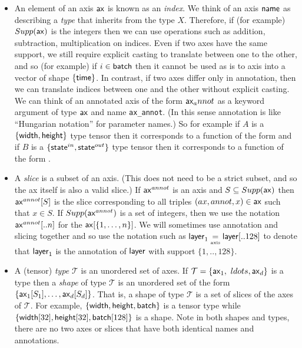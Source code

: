 \documentclass{article}
\newcommand{\defaxis}{\underset{\text{\tiny axis}}{=}}
\begin{document}
\begin{itemize}
  \item An element of an axis $\mathsf{ax}$ is known as an \emph{index}. We think of an axis $\mathsf{name}$ as describing a \emph{type} that inherits from the type $X$. Therefore, if (for example) $Supp(\mathsf{ax})$ is the integers then we can use operations such as addition, subtraction, multiplication on indices.  Even if two axes have the same support, we still require explicit casting to translate between one to the other, and so (for example) if $i \in \mathsf{batch}$ then it cannot be used as is to axis into a vector of shape $\{ \mathsf{time} \}$. In contrast, if two axes differ only in annotation, then we can translate indices between one and the other without explicit casting. We can think of an annotated axis of the form $\mathsf{ax}_annot$ as a keyword argument of type $\mathsf{ax}$ and name \texttt{ax\_annot}. (In this sense annotation is like ``Hungarian notation'' for parameter names.) So for example if $A$ is a $\{ \mathsf{width} , \mathsf{height} \}$ type tensor then it corresponds to a function of the form  and if $B$ is a $\{ \mathsf{state}^{in} , \mathsf{state}^{out} \}$ type tensor then it corresponds to a function of the form .


  
  \item A \emph{slice} is a subset of an axis. (This does not need to be a strict subset, and so the ax itself is also a valid slice.)  If $\mathsf{ax}^{annot}$ is an axis and $S \subseteq Supp(\mathsf{ax})$ then  $\mathsf{ax}^{annot}[S]$ is the slice corresponding to all triples $(ax,annot,x) \in \mathsf{ax}$ such that $x\in S$.  If $Supp(\mathsf{ax}^{annot})$ is a set of integers, then we use the notation $\mathsf{ax}^{annot}[..n]$ for the $\mathsf{ax}[\{1,\ldots, n \}]$. We will sometimes use annotation and slicing together and so use the notation such as $\name{layer}_1 \defaxis \name{layer}[..128]$ to denote that $\mathsf{layer}_1$ is the annotation of $\mathsf{layer}$ with support $\{1,..,128 \}$.  
   
  \item A (tensor) \emph{type} $\mathcal{T}$ is an unordered set of axes. If $\mathcal{T} = \{ \mathsf{ax}_1 ,\ ldots, \mathsf{ax}_d \}$ is a type then a \emph{shape} of type $\mathcal{T}$ is an unordered set of the form $\{ \mathsf{ax}_1[S_1] ,\ldots, \mathsf{ax}_d[S_d] \}$. That is, a shape of type $\mathcal{T}$ is a set of slices of the axes of $\mathcal{T}$. For example, $\{ \mathsf{width} , \mathsf{height}, \mathsf{batch} \}$ is a tensor type while $\{ \mathsf{width}[32], \mathsf{height}[32], \mathsf{batch}[128] \}$ is a shape. Note in both shapes and types, there are no two axes or slices that have both identical names and annotations.


\end{itemize}
\end{document}
